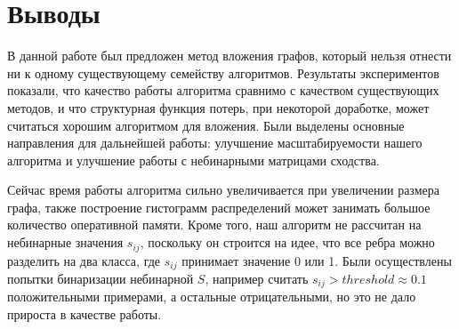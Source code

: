\documentclass[12pt,a4paper]{extarticle}
\begin{document}
    \section{Выводы}
    
    В данной работе был предложен метод вложения графов, который нельзя отнести ни к одному существующему семейству алгоритмов. Результаты экспериментов показали, что качество работы алгоритма сравнимо с качеством существующих методов, и что структурная функция потерь, при некоторой доработке, может считаться хорошим алгоритмом для вложения. Были выделены основные направления для дальнейшей работы: улучшение масштабируемости нашего алгоритма и улучшение работы с небинарными матрицами сходства.
    
    Сейчас время работы алгоритма сильно увеличивается при увеличении размера графа, также построение гистограмм распределений может занимать большое количество оперативной памяти. Кроме того, наш алгоритм не рассчитан на небинарные значения $s_{ij}$, поскольку он строится на идее, что все ребра можно разделить на два класса, где $s_{ij}$ принимает значение 0 или 1. Были осуществлены попытки бинаризации небинарной $S$, например считать $s_{ij} > threshold \approx 0.1$ положительными примерами, а остальные отрицательными, но это не дало прироста в качестве работы.
    
    
    
\end{document}
